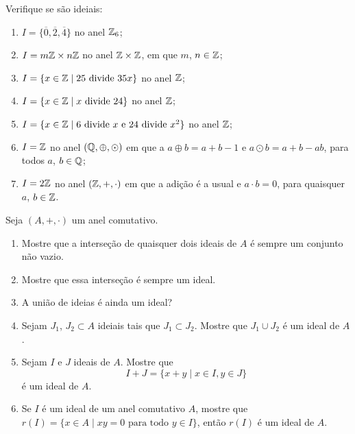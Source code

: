 \documentclass[12pt]{exam}
\begin{document}
    \questao{} Verifique se s\~ao ideiais:
    \begin{enumerate}[label=({\alph*})]
        \item  $I = \{\overline{0}, \overline{2}, \overline{4}\}$ no anel $\mathbb{Z}_6$;

        \item $I = m\mathbb{Z} \times n\mathbb{Z}$ no anel $\mathbb{Z} \times \mathbb{Z}$, em que $m$, $n \in \mathbb{Z}$;

        \item $I = \{x \in \mathbb{Z} \mid 25 \mbox{ divide } 35x\}$ no anel $\mathbb{Z}$;

        \item $I = \{x \in \mathbb{Z} \mid x \mbox{ divide } 24\}$ no anel $\mathbb{Z}$;

        \item $I = \{x \in \mathbb{Z} \mid 6 \mbox{ divide } x \mbox{ e } 24 \mbox{ divide } x^2\}$ no anel $\mathbb{Z}$;

        \item $I = \mathbb{Z}$ no anel $(\mathbb{Q}, \oplus, \odot)$ em que a $a \oplus b = a + b - 1$ e $a \odot b = a + b - ab$, para todos $a$, $b \in \mathbb{Q}$;

        \item $I = 2\mathbb{Z}$ no anel $(\mathbb{Z}, +, \cdot)$ em que a adi\c{c}\~ao \'e a usual e $a \cdot b = 0$, para quaisquer $a$, $b \in \mathbb{Z}$.
    \end{enumerate}

    \vspace{.3cm}

    \questao{} Seja $(A, +, \cdot)$ um anel comutativo.
    \begin{enumerate}[label=({\alph*})]
        \item Mostre que a interse\c{c}\~ao de quaisquer dois ideais de $A$ \'e sempre um conjunto n\~ao vazio.

        \item Mostre que essa interse\c{c}\~ao \'e sempre um ideal.

        \item A uni\~ao de ideias \'e ainda um ideal?

        \item Sejam $J_1$, $J_2 \subset A$ ideiais tais que $J_1 \subset J_2$. Mostre que $J_1 \cup J_2$ \'e um ideal de $A$.

        \item Sejam $I$ e $J$ ideais de $A$. Mostre que
        \[
            I + J = \{x + y \mid x \in I, y \in J\}
        \]
        \'e um ideal de $A$.

    \item Se $I$ é um ideal de um anel comutativo $A$, mostre que $r(I) = \{x \in A \mid xy = 0 \mbox{ para todo } y \in I\}$, então $r(I)$ é um ideal de $A$.
    \end{enumerate}
\end{document}
